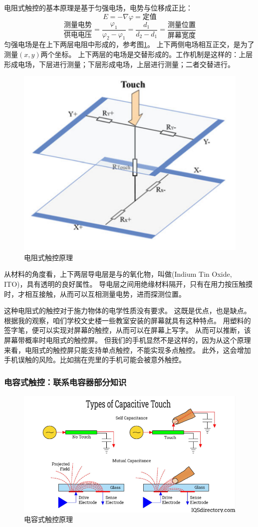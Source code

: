 \documentclass[UTF-8]{ctexart}
\begin{document}
电阻式触控的基本原理是基于匀强电场，电势与位移成正比：
$$
E = -\nabla \varphi=\text{定值}   
$$
$$
\frac{\text{测量电势}}{\text{供电电压}}=\frac{\varphi_1}{\varphi_2-\varphi_1}=\frac{d_1}{d_2-d_1}=\frac{\text{测量位置}}{\text{屏幕宽度}}
$$
匀强电场是在上下两层电阻中形成的\cite{Touch}，参考图\ref{电阻式触控原理}。
上下两侧电场相互正交，是为了测量$(x,y)$两个坐标。
上下两层的电场是交替形成的。工作机制是这样的：上层形成电场，下层进行测量；下层形成电场，上层进行测量；二者交替进行。
\begin{figure}
    \centering
    \includegraphics[width=0.5\linewidth]{../Figures/resistive.png}
    \caption{电阻式触控原理\cite{Touch}}
    \label{电阻式触控原理}
\end{figure}
从材料的角度看，上下两层导电层是与的氧化物，叫做(Indium Tin Oxide, ITO)，具有透明的良好属性\cite{ITO}。
导电层之间用绝缘材料隔开，只有在用力按压触摸时，才相互接触，从而可以互相测量电势，进而探测位置。

这种电阻式的触控对于施力物体的电学性质没有要求。
这既是优点，也是缺点。
根据我的观察，咱们学校文史楼一些教室安装的屏幕就具有这种特点。
用塑料的签字笔，便可以实现对屏幕的触控，从而可以在屏幕上写字。
从而可以推断，该屏幕带概率时电阻式的触控屏。
但我们的手机显然不是这样的，因为从这个原理来看，电阻式的触控屏只能支持单点触控，不能实现多点触控。
此外，这会增加手机误触的风险。比如揣在兜里的手机可能会被意外触控。

\subsubsection{电容式触控：联系电容器部分知识}

\begin{figure}
    \centering
    \includegraphics[width=0.7\linewidth]{../Figures/capacitive.png}
    \caption{电容式触控原理\cite{Capacitive}}
    \label{电容式触控原理}
\end{figure}
\end{document}
